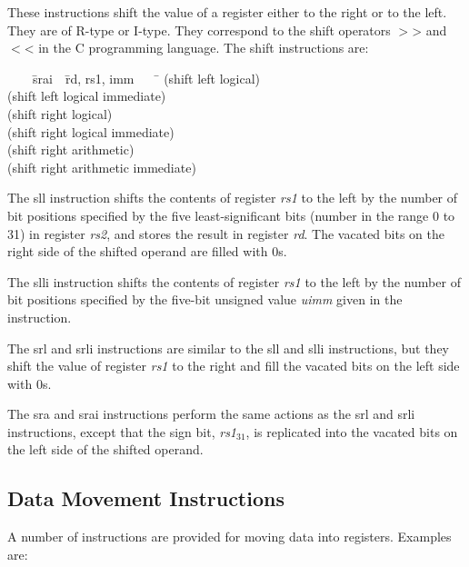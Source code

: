 \documentclass[11pt, twoside, pdftex]{article}
\newenvironment{ctabbing}%
{\begin{center}\begin{minipage}{\textwidth}\begin{tabbing}}
{\end{tabbing}\end{minipage}\end{center}}
\begin{document}
These instructions shift the value of a register either to the right or to the left.
They are of R-type or I-type. They correspond to the shift operators $>$> and $<$< in the C 
programming language.  The shift instructions are:
\vspace{-\baselineskip}
\begin{ctabbing}
~~~~\={\sf srai}~~\={\sf rd, rs1, imm}~~~~\=\kill
{}  \>(shift left logical)\\
  \>(shift left logical immediate)\\
  \>(shift right logical)\\
  \>(shift right logical immediate)\\
  \>(shift right arithmetic)\\
  \>(shift right arithmetic immediate)
\end{ctabbing}

\noindent
The {\sf sll} instruction shifts the contents of register {\it rs1} to the left by the number 
of bit positions specified by the five least-significant bits (number in the range 0 to 31)
in register {\it rs2}, and stores the result in register {\it rd}. The vacated bits on the
right side of the shifted operand are filled with 0s.

\noindent
The {\sf slli} instruction shifts the contents of register {\it rs1} to the left by the number 
of bit positions specified by the five-bit unsigned value {\it uimm} given in the instruction.

\noindent
The {\sf srl} and {\sf srli} instructions are similar to the {\sf sll} and {\sf slli}
instructions, but they shift the value of register {\it rs1} to the right and fill the vacated
bits on the left side with 0s.

\noindent
The {\sf sra} and {\sf srai} instructions perform the same actions as the {\sf srl} and 
{\sf srli} instructions, except that the sign bit, {\it rs1}$_{31}$, is replicated into 
the vacated bits on the left side of the shifted operand.

\subsection{Data Movement Instructions}

A number of instructions are provided for moving data into registers. Examples are:
\end{document}
